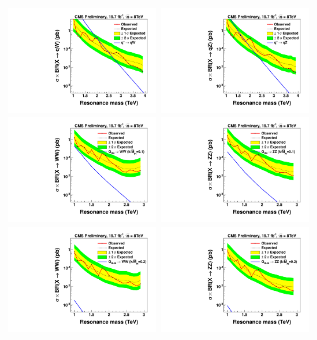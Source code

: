 \begin{figure}[h!tpb]
\begin{center}
\includegraphics[width=0.35\textwidth]{figs/limits/brazilianFlag_qW_low_purity.pdf}
\includegraphics[width=0.35\textwidth]{figs/limits/brazilianFlag_qZ_low_purity.pdf}\\
\includegraphics[width=0.35\textwidth]{figs/limits/brazilianFlag_RS1WW_low_purity.pdf}
\includegraphics[width=0.35\textwidth]{figs/limits/brazilianFlag_RS1ZZ_low_purity.pdf}\\
\includegraphics[width=0.35\textwidth]{figs/limits/brazilianFlag_BulkWW_low_purity.pdf}
\includegraphics[width=0.35\textwidth]{figs/limits/brazilianFlag_BulkZZ_low_purity.pdf}\\

\end{center}
\end{figure}
